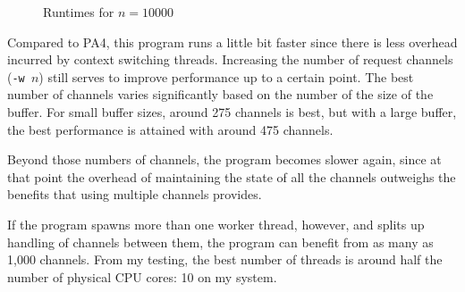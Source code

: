 \documentclass[10pt]{article}
\begin{document}
\begin{figure}[h]
\caption{Runtimes for $n = 10000$}
\end{figure}

Compared to PA4, this program runs a little bit faster since there is less overhead incurred by context switching threads. Increasing the number of request channels (\texttt{-w $n$}) still serves to improve performance up to a certain point. The best number of channels varies significantly based on the number of the size of the buffer. For small buffer sizes, around 275 channels is best, but with a large buffer, the best performance is attained with around 475 channels.

Beyond those numbers of channels, the program becomes slower again, since at that point the overhead of maintaining the state of all the channels outweighs the benefits that using multiple channels provides.

If the program spawns more than one worker thread, however, and splits up handling of channels between them, the program can benefit from as many as 1,000 channels. From my testing, the best number of threads is around half the number of physical CPU cores: 10 on my system.
\end{document}
